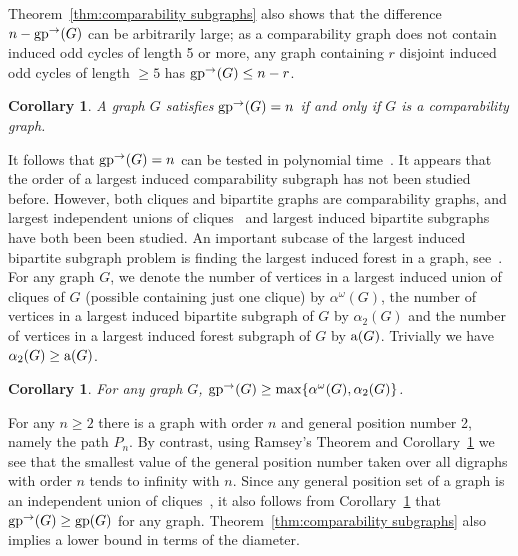 \documentclass[a4paper,12pt]{article}
\newtheorem{corollary}[theorem]{Corollary}
\theoremstyle{definition}
\newcommand{\ac}{{\rm a}}
\newcommand{\gp}{{\rm gp}}
\newcommand{\ugp}{{\rm gp^{\rightarrow }}}
\begin{document}
	Theorem~\ref{thm:comparability subgraphs} also shows that the difference $n-\ugp (G)$ can be arbitrarily large; as a comparability graph does not contain induced odd cycles of length 5 or more, any graph containing $r$ disjoint induced odd cycles of length $\geq 5$ has $\ugp (G) \leq n-r$. 
	
	\begin{corollary}\label{cor:comparability}
		A graph $G$ satisfies $\ugp (G) = n$ if and only if $G$ is a comparability graph.
	\end{corollary}
	
	It follows that $\ugp (G) = n$ can be tested in polynomial time~\cite{McConnell}. It appears that the order of a largest induced comparability subgraph has not been studied before. However, both cliques and bipartite graphs are comparability graphs, and largest independent unions of cliques~\cite{unionofcliques} and largest induced bipartite subgraphs~\cite{bipartitesubgraphs} have both been been studied. An important subcase of the largest induced bipartite subgraph problem is finding the largest induced forest in a graph, see~\cite{Alon}.  For any graph $G$, we denote the number of vertices in a largest induced union of cliques of $G$ (possible containing just one clique) by $\alpha ^{\omega }(G)$, the number of vertices in a largest induced bipartite subgraph of $G$ by $\alpha _2(G)$ and the number of vertices in a largest induced forest subgraph of $G$ by $\ac(G)$. Trivially we have $\alpha _2(G) \geq \ac (G)$.
	
	
	\begin{corollary}\label{cor:induced bipartite bound}
		For any graph $G$, $\ugp (G) \geq \max \{ \alpha ^{\omega }(G),\alpha _2(G)\} $.
	\end{corollary}
	
	For any $n \geq 2$ there is a graph with order $n$ and general position number 2, namely the path $P_n$. By contrast, using Ramsey's Theorem and Corollary~\ref{cor:induced bipartite bound} we see that the smallest value of the general position number taken over all digraphs with order $n$ tends to infinity with $n$. Since any general position set of a graph is an independent union of cliques~\cite{AnaChaChaKlaTho}, it also follows from Corollary~\ref{cor:induced bipartite bound} that $\ugp (G) \geq \gp (G)$ for any graph. Theorem~\ref{thm:comparability subgraphs} also implies a lower bound in terms of the diameter.
	
\end{document}
